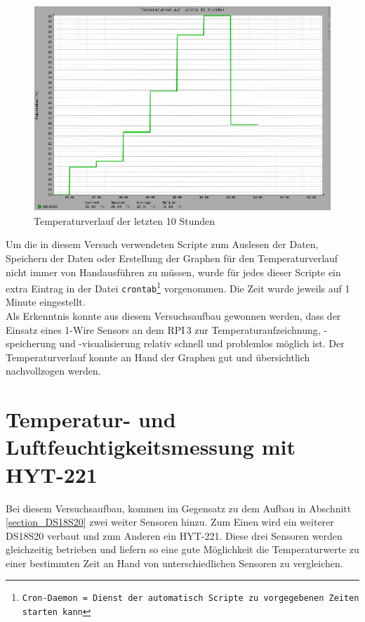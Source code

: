 \begin{figure}[!h] 
  \centering
     \includegraphics[scale=.28]{BilderAllgemein/TemperaturTag.png}
  \caption{Temperaturverlauf der letzten 10 Stunden}
  \label{Abb_Temperaturverlauf_10Stunden_DS18S20}
\end{figure}

Um die in diesem Versuch verwendeten Scripte zum Auslesen der Daten, Speichern der Daten oder Erstellung der Graphen für den Temperaturverlauf nicht immer von \glqq Hand\grqq ausführen zu müssen, wurde für jedes dieser Scripte ein extra Eintrag in der Datei \texttt{crontab\footnote{Cron-Daemon = Dienst der automatisch Scripte zu vorgegebenen Zeiten starten kann}} vorgenommen. Die Zeit wurde jeweils auf 1 Minute eingestellt.\\
Als Erkenntnis konnte aus diesem Versuchsaufbau gewonnen werden, dass der Einsatz eines 1-Wire Sensors an dem \ac{RPI}\,3 zur Temperaturaufzeichnung, -speicherung und -visualisierung relativ schnell und problemlos möglich ist. Der Temperaturverlauf konnte an Hand der Graphen gut und übersichtlich nachvollzogen werden. 

\section{Temperatur- und Luftfeuchtigkeitsmessung mit HYT-221}
\label{section_HTY221}
Bei diesem Versuchsaufbau, kommen im Gegensatz zu dem Aufbau in Abschnitt \ref{section_DS18S20} zwei weiter Sensoren hinzu. Zum Einen wird ein weiterer DS18S20 verbaut und zum Anderen ein HYT-221. Diese drei Sensoren werden gleichzeitig betrieben und liefern so eine gute Möglichkeit die Temperaturwerte zu einer bestimmten Zeit an Hand von unterschiedlichen Sensoren zu vergleichen.
